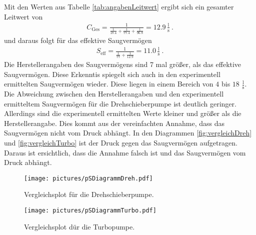 Mit den Werten aus Tabelle \eqref{tab:angabenLeitwert} ergibt sich ein gesamter Leitwert von
\begin{align}
  C_\text{Ges} = \frac{1}{ \frac{1}{18.4} + \frac{1}{77.4} + \frac{1}{96.8} } = 12.9\, \frac{\text{l}}{\text{s}} \ .
\end{align}
und daraus folgt für das effektive Saugvermögen
\begin{align}
  S_\text{eff} = \frac{1}{\frac{1}{77} + \frac{1}{12.9}} = 11.0\, \frac{\text{l}}{\text{s}} \ .
\end{align}
Die Herstellerangaben des Saugvermögens sind 7 mal größer, als das effektive Saugvermögen. Diese Erkenntis spiegelt sich auch in den experimentell ermittelten Saugvermögen wieder. Diese liegen in einem Bereich von $4$ bis $18$ $\frac{\text{l}}{\text{s}}$. \\
Die Abweichung zwischen den Herstellerangaben und den experimentell ermitteltem Saugvermögen für die Drehschieberpumpe ist deutlich geringer. Allerdings sind die experimentell ermittelten Werte kleiner und größer als die Herstellerangabe. Dies kommt aus der vereinfachten Annahme, dass das Saugvermögen nicht vom Druck abhängt. In den Diagrammen \eqref{fig:vergleichDreh} und \eqref{fig:vergleichTurbo} ist der Druck gegen das Saugvermögen aufgetragen. Daraus ist ersichtlich, dass die Annahme falsch ist und das Saugvermögen vom Druck abhängt.

\begin{figure}
  \centering
  \texttt{[image: pictures/pSDiagrammDreh.pdf]}
  \caption{Vergleichsplot für die Drehschieberpumpe.}
  \label{fig:vergleichDreh}
\end{figure}

\begin{figure}
  \centering
  \texttt{[image: pictures/pSDiagrammTurbo.pdf]}
  \caption{Vergleichsplot dür die Turbopumpe.}
  \label{fig:vergleichTurbo}
\end{figure}
